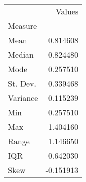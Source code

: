 \begin{tabu}{lr}
\toprule
 & Values \\
Measure &  \\
\midrule
Mean & 0.814608 \\
Median & 0.824480 \\
Mode & 0.257510 \\
St. Dev. & 0.339468 \\
Variance & 0.115239 \\
Min & 0.257510 \\
Max & 1.404160 \\
Range & 1.146650 \\
IQR & 0.642030 \\
Skew & -0.151913 \\
\bottomrule
\end{tabu}